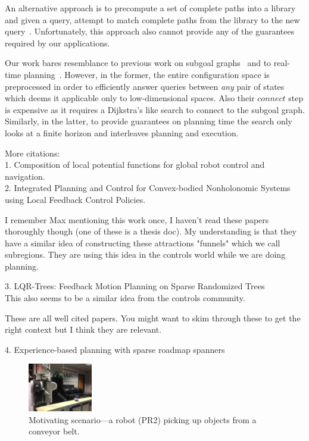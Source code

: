 \documentclass[letterpaper]{article} %
\begin{document}
An alternative approach is to precompute a set of complete paths into a library and given a query, attempt to match complete paths
from the library to the new query~\cite{berenson2012robot,jetchev2013fast}.
Unfortunately, this approach also cannot provide any of the guarantees required by our applications.

Our work bares resemblance to previous work on 
subgoal graphs~\cite{UK17,UK18} and to real-time planning~\cite{KL06,KS09,K90}.
However, in the former, the entire configuration space is preprocessed in order to efficiently answer queries between \emph{any} pair of states which deems it applicable only to low-dimensional spaces.
{\color{blue} Also their $connect$ step is expensive as it requires a Dijkstra's like search to connect to the subgoal graph.} Similarly, in the latter, to provide guarantees on planning time the search only looks at a finite horizon and interleaves planning and execution.

{\color{blue} 
More citations:\\
1. Composition of local potential functions for global robot control and navigation.\\
2. Integrated Planning and Control for Convex-bodied Nonholonomic Systems using Local Feedback Control Policies.

I remember Max mentioning this work once, I haven't read these papers thoroughly though (one of these is a thesis doc). My understanding is that they have a similar idea of constructing these attractions "funnels" which we call subregions. They are using this idea in the controls world while we are doing planning.

3. LQR-Trees: Feedback Motion Planning
on Sparse Randomized Trees \\
This also seems to be a similar idea from the controls community.

These are all well cited papers. You might want to skim through these to get the right context but I think they are relevant.

4. Experience-based planning with sparse roadmap spanners \\
}

\begin{figure}[tb]
  \centering
    \includegraphics[width=0.25\textwidth]{PR2.jpg}
  \caption{
  Motivating scenario---a robot (PR2) picking up objects from a conveyor belt.
}
    \label{fig:PR2}
 \vspace{-6mm}
\end{figure}
\end{document}
